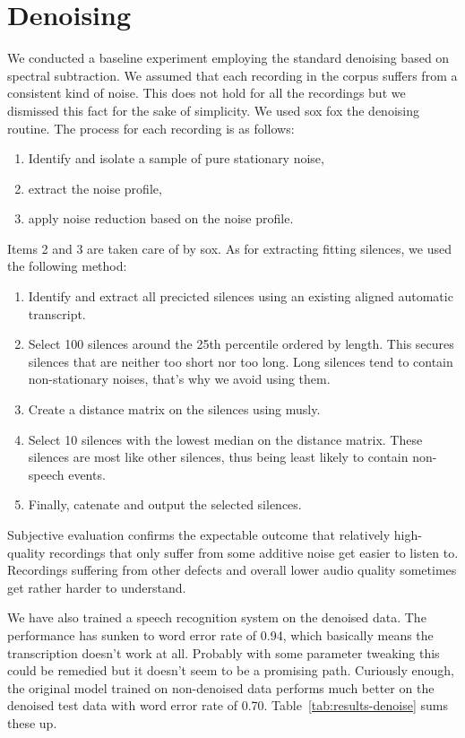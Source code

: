 \documentclass[conference]{IEEEtran}
\begin{document}
\section{Denoising}

We conducted a baseline experiment employing the standard denoising based on
spectral subtraction. We assumed that each recording in the
corpus suffers from a consistent kind of noise. This does not hold for all the
recordings but we dismissed this fact for the sake of simplicity. We used sox
fox the denoising routine. The process for each recording is as follows:
\begin{enumerate}
\item{Identify and isolate a sample of pure stationary noise,}
\item{extract the noise profile,}
\item{apply noise reduction based on the noise profile.}
\end{enumerate}

Items 2 and 3 are taken care of by sox. As for extracting fitting silences, we
used the following method:
\begin{enumerate}
\item{
    Identify and extract all precicted silences using an
    existing aligned automatic transcript.
}
\item{
    Select 100 silences around the 25th percentile ordered by length.
    This secures silences that are neither too short nor too long. Long silences
    tend to contain non-stationary noises, that's why we avoid using them.
}
\item{
    Create a distance matrix on the silences using
    musly\cite{schnitzer2011using}.
}
\item{
    Select 10 silences with the lowest median on the distance matrix. These
    silences are most like other silences, thus being least likely to contain
    non-speech events.
}
\item{
    Finally, catenate and output the selected silences.
}
\end{enumerate}

Subjective evaluation confirms the expectable outcome that relatively
high-quality recordings that only suffer from some additive noise get
easier to listen to. Recordings suffering from other defects and overall lower
audio quality sometimes get rather harder to understand.

We have also trained a speech recognition system on the denoised data. The
performance has sunken to word error rate of 0.94, which basically means the
transcription doesn't work at all. Probably with some parameter tweaking this
could be remedied but it doesn't seem to be a promising path. Curiously enough, the
original model trained on non-denoised data performs much better on the denoised
test data with word error rate of 0.70. Table~\ref{tab:results-denoise} sums
these up.
\end{document}
